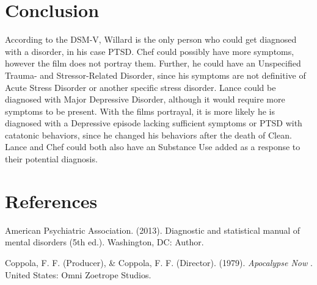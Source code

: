 \documentclass[a4paper,man,natbib]{apa6}
\begin{document}
\section{Conclusion}	

According to the DSM-V, Willard is the only person who could get diagnosed with a disorder, in his case PTSD. Chef could possibly have more symptoms, however the film does not portray them. Further, he could have an Unspecified Trauma- and
Stressor-Related Disorder, since his symptoms are not definitive of Acute Stress Disorder or another specific stress disorder. Lance could be diagnosed with Major Depressive Disorder, although it would require more symptoms to be present. With the films portrayal, it is more likely he is diagnosed with a Depressive episode lacking sufficient symptoms or PTSD with catatonic behaviors, since he changed his behaviors after the death of Clean. Lance and Chef could both also have an Substance Use added as a response to their potential diagnosis. \\

\raggedbottom
\pagebreak
\section{References}

\noindent American Psychiatric Association. (2013). Diagnostic and statistical manual of mental
\indent disorders (5th ed.). Washington, DC: Author.

\noindent Coppola, F. F. (Producer), \& Coppola, F. F. (Director). (1979). \textit{Apocalypse Now}
. United States: Omni Zoetrope Studios.
\end{document}
